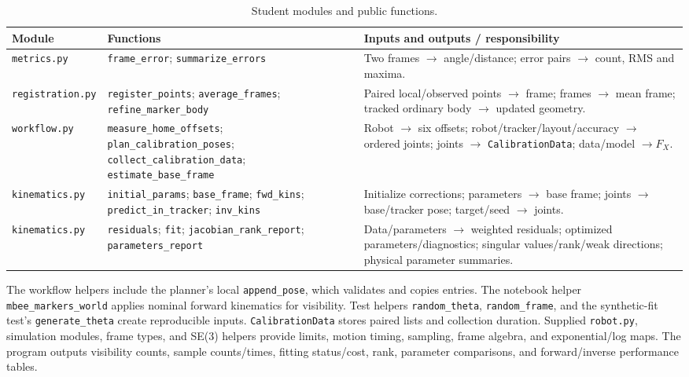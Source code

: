 \documentclass[11pt]{article}
\begin{document}
\begin{table}[H]\centering\footnotesize
\caption{Student modules and public functions.}
\begin{tabularx}{\linewidth}{@{}p{.19\linewidth}p{.36\linewidth}Y@{}}\toprule
Module & Functions & Inputs and outputs / responsibility\\\midrule
\texttt{metrics.py} & \texttt{frame\_error}; \texttt{summarize\_errors} & Two frames $\to$ angle/distance; error pairs $\to$ count, RMS and maxima.\\
\texttt{registration.py} & \texttt{register\_points}; \texttt{average\_frames}; \texttt{refine\_marker\_body} & Paired local/observed points $\to$ frame; frames $\to$ mean frame; tracked ordinary body $\to$ updated geometry.\\
\texttt{workflow.py} & \texttt{measure\_home\_offsets}; \texttt{plan\_calibration\_poses}; \texttt{collect\_calibration\_data}; \texttt{estimate\_base\_frame} & Robot $\to$ six offsets; robot/tracker/layout/accuracy $\to$ ordered joints; joints $\to$ \texttt{CalibrationData}; data/model $\to F_X$.\\
\texttt{kinematics.py} & \texttt{initial\_params}; \texttt{base\_frame}; \texttt{fwd\_kins}; \texttt{predict\_in\_tracker}; \texttt{inv\_kins} & Initialize corrections; parameters $\to$ base frame; joints $\to$ base/tracker pose; target/seed $\to$ joints.\\
\texttt{kinematics.py} & \texttt{residuals}; \texttt{fit}; \texttt{jacobian\_rank\_report}; \texttt{parameters\_report} & Data/parameters $\to$ weighted residuals; optimized parameters/diagnostics; singular values/rank/weak directions; physical parameter summaries.\\\bottomrule
\end{tabularx}\end{table}
The workflow helpers include the planner's local \texttt{append\_pose}, which validates and copies entries. The notebook helper \texttt{mbee\_markers\_world} applies nominal forward kinematics for visibility. Test helpers \texttt{random\_theta}, \texttt{random\_frame}, and the synthetic-fit test's \texttt{generate\_theta} create reproducible inputs. \texttt{CalibrationData} stores paired lists and collection duration. Supplied \texttt{robot.py}, simulation modules, frame types, and SE(3) helpers provide limits, motion timing, sampling, frame algebra, and exponential/log maps. The program outputs visibility counts, sample counts/times, fitting status/cost, rank, parameter comparisons, and forward/inverse performance tables.
\end{document}
